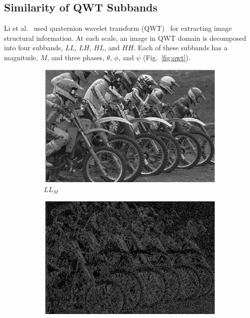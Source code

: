 \subsection{Similarity of QWT Subbands}
Li et al.~\cite{Li2018a} used quaternion wavelet transform (QWT)~\cite{Muraleetharan2015} for extracting image structural information. At each scale, an image in QWT domain is decomposed into four subbands, $LL$, $LH$, $HL$, and $HH$. Each of these subbands has a magnitude, $M$, and three phases, $\theta$, $\phi$, and $\psi$ (Fig.~\ref{fig:qwt}).
\begin{figure}
     \centering
     \begin{subfigure}[b]{0.23\textwidth}
         \centering
         \includegraphics[width=\textwidth]{./figs/m_1_1_q}
         \caption{$LL_M$}
         \label{fig:qwt1}
     \end{subfigure}
     \begin{subfigure}[b]{0.23\textwidth}
         \centering
         \includegraphics[width=\textwidth]{./figs/o_1_1_1_q}

\end{subfigure}
\end{figure}

